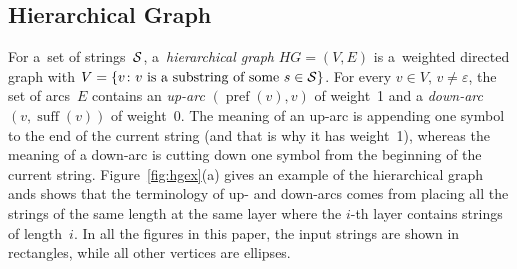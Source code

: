 \documentclass[11pt]{article}
\newtheorem{definition}{Definition}
\DeclareMathOperator{\pref}{pref}
\DeclareMathOperator{\suff}{suff}
\begin{document}
\subsection{Hierarchical Graph}
For a~set of strings~${\cal S}$, a~\emph{hierarchical graph} $HG=(V,E)$ is a~weighted directed graph with $V=\{v \colon \text{$v$ is a~substring of some $s \in {\cal S}$}\}$. For every $v \in V,\, v \neq \varepsilon$, the set of arcs~$E$ contains an {\em up-arc} $(\pref(v), v)$ of weight~1 and a {\em down-arc} $(v, \suff(v))$ of weight~0. The meaning of an up-arc is appending one symbol to the end of the current string (and that is why it has weight~1), whereas the meaning of a down-arc is cutting down one symbol from the beginning of the current string.
%
Figure~\ref{fig:hgex}(a) gives an example of the hierarchical graph ands shows that the terminology of up- and down-arcs comes from placing all the strings of the same length at the same layer where the $i$-th layer contains strings of length~$i$.  In all the figures in this paper, the input strings are shown in rectangles, while all other vertices are ellipses.

\newcommand{\we}[4]{
\begin{scope}[xshift=#1mm,yshift=#2mm]
\foreach \n/\x/\y in {aaa/0/3, cae/1/3, aec/3/3, eee/4/3}
  \node[inputvertex] (\n) at (\x,\y) {\tt \n};
%  
\foreach \n/\x/\y in {aa/0/2, ca/1/2, ae/2/2, ec/3/2, ee/4/2, a/1/1, c/2/1, e/3/1}
  \node[vertex] (\n) at (\x,\y) {\tt \n};
%
\node[vertex] (eps) at (2,0) {$\varepsilon$};
%
\foreach \f/\t/\a in {eps/e/10, e/eps/10, eps/c/10, c/eps/10, eps/a/10, a/eps/10, a/aa/10, aa/a/10, aa/aaa/10, aaa/aa/10, c/ca/0, ca/cae/0, cae/ae/0, ae/aec/0, aec/ec/0, ee/eee/10, eee/ee/10, e/ee/10, ee/e/10, ca/a/0, a/ae/0, ae/e/0, e/ec/0, ec/c/0}
  \path (\f) edge[hgedge,bend left=\a] (\t);
  
\node at (2,-1) {(#3)};

#4
\end{scope}
}
\end{document}
